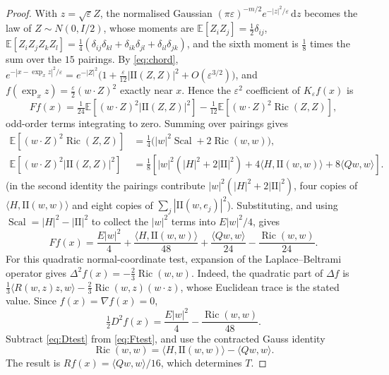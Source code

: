 \documentclass[11pt,a4paper]{article}
\theoremstyle{definition}\newtheorem{definition}[theorem]{Definition}
\theoremstyle{remark}\newtheorem{remark}[theorem]{Remark}
\newcommand{\eps}{\varepsilon}
\newcommand{\dd}{\,\mathrm d}
\newcommand{\II}{\mathrm{II}}
\newcommand{\Ric}{\operatorname{Ric}}
\newcommand{\Scal}{\operatorname{Scal}}
\begin{document}
\begin{proof}
With $z=\sqrt\eps Z$, the normalised Gaussian $(\pi\eps)^{-m/2}e^{-|z|^2/\eps}\dd z$ becomes the law of $Z\sim N(0,I/2)$, whose moments are $\mathbb E[Z_iZ_j]=\tfrac12\delta_{ij}$, $\mathbb E[Z_iZ_jZ_kZ_l]=\tfrac14(\delta_{ij}\delta_{kl}+\delta_{ik}\delta_{jl}+\delta_{il}\delta_{jk})$, and the sixth moment is $\tfrac18$ times the sum over the $15$ pairings. By \eqref{eq:chord}, $e^{-|x-\exp_xz|^2/\eps}=e^{-|Z|^2}\bigl(1+\tfrac\eps{12}|\II(Z,Z)|^2+O(\eps^{3/2})\bigr)$, and $f(\exp_xz)=\tfrac\eps2(w\cdot Z)^2$ exactly near $x$. Hence the $\eps^2$ coefficient of $K_\eps f(x)$ is
\[
Ff(x)=\tfrac1{24}\mathbb E[(w\cdot Z)^2|\II(Z,Z)|^2]-\tfrac1{12}\mathbb E[(w\cdot Z)^2\Ric(Z,Z)],
\]
odd-order terms integrating to zero. Summing over pairings gives
\begin{align}
\mathbb E[(w\cdot Z)^2\Ric(Z,Z)]
&=\tfrac14\bigl(|w|^2\Scal+2\Ric(w,w)\bigr),\\
\mathbb E[(w\cdot Z)^2|\II(Z,Z)|^2]
&=\tfrac18\left[|w|^2(|H|^2+2|\II|^2)
+4\langle H,\II(w,w)\rangle+8\langle Qw,w\rangle\right].
\end{align}
(in the second identity the pairings contribute $|w|^2(|H|^2+2|\II|^2)$, four copies of $\langle H,\II(w,w)\rangle$ and eight copies of $\sum_j|\II(w,e_j)|^2$). Substituting, and using $\Scal=|H|^2-|\II|^2$ to collect the $|w|^2$ terms into $E|w|^2/4$, gives
\begin{equation}\label{eq:Ftest}
Ff(x)=\frac{E|w|^2}{4}
+\frac{\langle H,\II(w,w)\rangle}{48}
+\frac{\langle Qw,w\rangle}{24}-\frac{\Ric(w,w)}{24}.
\end{equation}
For this quadratic normal-coordinate test, expansion of the Laplace--Beltrami operator gives
$\Delta^2f(x)=-\tfrac23\Ric(w,w)$.
Indeed, the quadratic part of $\Delta f$ is
$\tfrac13\langle R(w,z)z,w\rangle-\tfrac23\Ric(w,z)(w\cdot z)$, whose Euclidean trace is the stated value.
Since $f(x)=\nabla f(x)=0$,
\begin{equation}\label{eq:Dtest}
\tfrac12D^2f(x)=\frac{E|w|^2}{4}-\frac{\Ric(w,w)}{48}.
\end{equation}
Subtract \eqref{eq:Dtest} from \eqref{eq:Ftest}, and use the contracted Gauss identity
\[
\Ric(w,w)=\langle H,\II(w,w)\rangle-\langle Qw,w\rangle.
\]
The result is $Rf(x)=\langle Qw,w\rangle/16$, which determines $T$.
\end{proof}
\end{document}

